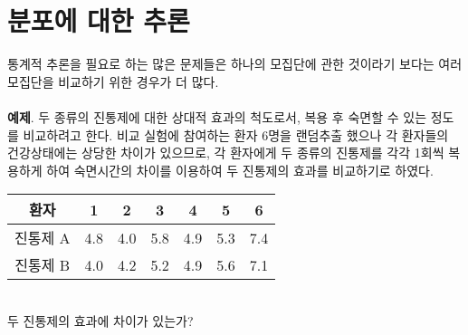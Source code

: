 \section{분포에 대한 추론}
통계적 추론을 필요로 하는 많은 문제들은 하나의 모집단에 관한 것이라기 보다는 여러 모집단을 비교하기 위한 경우가 더 많다. \\\\
\textbf{예제}. 두 종류의 진통제에 대한 상대적 효과의 척도로서, 복용 후 숙면할 수 있는 정도를 비교하려고 한다. 비교 실험에 참여하는 환자 6명을 랜덤추출 했으나 각 환자들의 건강상태에는 상당한 차이가 있으므로, 각 환자에게 두 종류의 진통제를 각각 1회씩 복용하게 하여 숙면시간의 차이를 이용하여 두 진통제의 효과를 비교하기로 하였다.\\
\begin{center}
	\begin{tabular}{c|c|c|c|c|c|c}
		환자 & 1& 2&3&4&5&6 \\\hline
		진통제 A&4.8&4.0&5.8&4.9&5.3&7.4 \\\hline
		진통제 B&4.0&4.2&5.2&4.9&5.6&7.1
	\end{tabular}
\end{center}~\\
두 진통제의 효과에 차이가 있는가?\\\\


\\

